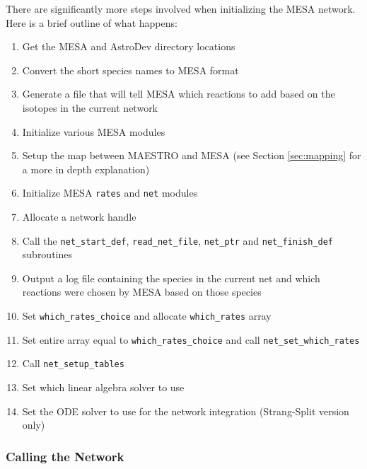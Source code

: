 There are significantly more steps involved when initializing the {\sf MESA} 
network. Here is a brief outline of what happens:
\begin{enumerate}
\item Get the {\sf MESA} and {\sf AstroDev} directory locations
\item Convert the short species names to {\sf MESA} format
\item Generate a file that will tell {\sf MESA} which reactions to add based 
on the isotopes in the current network
\item Initialize various {\sf MESA} modules
\item Setup the map between {\sf MAESTRO} and {\sf MESA} (see Section 
\ref{sec:mapping} for a more in depth explanation)
\item Initialize {\sf MESA} {\tt rates} and {\tt net} modules
\item Allocate a network handle
\item Call the {\tt net\_start\_def}, {\tt read\_net\_file}, {\tt net\_ptr} 
and {\tt net\_finish\_def} subroutines
\item Output a log file containing the species in the current net and which 
reactions were chosen by {\sf MESA} based on those species
\item Set {\tt which\_rates\_choice} and allocate {\tt which\_rates} array
\item Set entire array equal to {\tt which\_rates\_choice} and call 
{\tt net\_set\_which\_rates}
\item Call {\tt net\_setup\_tables}
\item Set which linear algebra solver to use
\item Set the ODE solver to use for the network integration (Strang-Split 
version only)
\end{enumerate}

\subsubsection{Calling the Network}

